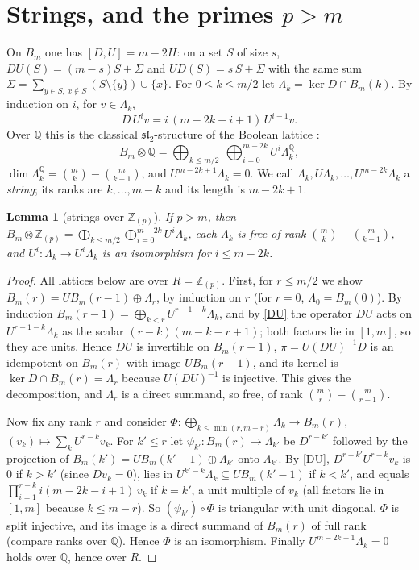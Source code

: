 \documentclass[10pt]{article}
\theoremstyle{ds}
\newtheorem{lemma}{Lemma}
\theoremstyle{dsrem}
\newcommand{\Z}{\mathbb{Z}}
\newcommand{\Q}{\mathbb{Q}}
\begin{document}
\section{Strings, and the primes $p>m$}

On $B_m$ one has $[D,U]=m-2H$: on a set $S$ of size $s$, $DU(S)=(m-s)S+\Sigma$ and $UD(S)=s\,S+\Sigma$ with the same sum $\Sigma=\sum_{y\in S,\,x\notin S}(S\setminus\{y\})\cup\{x\}$. For $0\le k\le m/2$ let $\Lambda_k=\ker D\cap B_m(k)$. By induction on $i$, for $v\in\Lambda_k$,
\begin{equation}\label{DU}
D\,U^iv=i\,(m-2k-i+1)\,U^{i-1}v .
\end{equation}
Over $\Q$ this is the classical $\mathfrak{sl}_2$-structure of the Boolean lattice \cite{Pro}:
\[B_m\otimes\Q=\bigoplus_{k\le m/2}\ \bigoplus_{i=0}^{m-2k}U^i\Lambda_k^{\Q},\]
$\dim\Lambda^{\Q}_k=\binom mk-\binom m{k-1}$, and $U^{m-2k+1}\Lambda_k=0$. We call $\Lambda_k,U\Lambda_k,\dots,U^{m-2k}\Lambda_k$ a \emph{string}; its ranks are $k,\dots,m-k$ and its length is $m-2k+1$.

\begin{lemma}[strings over $\Z_{(p)}$]\label{strings}
If $p>m$, then $B_m\otimes\Z_{(p)}=\bigoplus_{k\le m/2}\bigoplus_{i=0}^{m-2k}U^i\Lambda_k$, each $\Lambda_k$ is free of rank $\binom mk-\binom m{k-1}$, and $U^i\colon\Lambda_k\to U^i\Lambda_k$ is an isomorphism for $i\le m-2k$.
\end{lemma}

\begin{proof}
All lattices below are over $R=\Z_{(p)}$. First, for $r\le m/2$ we show $B_m(r)=U B_m(r-1)\oplus\Lambda_r$, by induction on $r$ (for $r=0$, $\Lambda_0=B_m(0)$). By induction $B_m(r-1)=\bigoplus_{k<r}U^{r-1-k}\Lambda_k$, and by \eqref{DU} the operator $DU$ acts on $U^{r-1-k}\Lambda_k$ as the scalar $(r-k)(m-k-r+1)$; both factors lie in $[1,m]$, so they are units. Hence $DU$ is invertible on $B_m(r-1)$, $\pi=U(DU)^{-1}D$ is an idempotent on $B_m(r)$ with image $UB_m(r-1)$, and its kernel is $\ker D\cap B_m(r)=\Lambda_r$ because $U(DU)^{-1}$ is injective. This gives the decomposition, and $\Lambda_r$ is a direct summand, so free, of rank $\binom mr-\binom m{r-1}$.

Now fix any rank $r$ and consider $\Phi\colon\bigoplus_{k\le\min(r,m-r)}\Lambda_k\to B_m(r)$, $(v_k)\mapsto\sum_kU^{r-k}v_k$. For $k'\le r$ let $\psi_{k'}\colon B_m(r)\to\Lambda_{k'}$ be $D^{r-k'}$ followed by the projection of $B_m(k')=UB_m(k'-1)\oplus\Lambda_{k'}$ onto $\Lambda_{k'}$. By \eqref{DU}, $D^{r-k'}U^{r-k}v_k$ is $0$ if $k>k'$ (since $Dv_k=0$), lies in $U^{k'-k}\Lambda_k\subseteq UB_m(k'-1)$ if $k<k'$, and equals $\prod_{i=1}^{r-k}i(m-2k-i+1)\,v_k$ if $k=k'$, a unit multiple of $v_k$ (all factors lie in $[1,m]$ because $k\le m-r$). So $(\psi_{k'})\circ\Phi$ is triangular with unit diagonal, $\Phi$ is split injective, and its image is a direct summand of $B_m(r)$ of full rank (compare ranks over $\Q$). Hence $\Phi$ is an isomorphism. Finally $U^{m-2k+1}\Lambda_k=0$ holds over $\Q$, hence over $R$.
\end{proof}
\end{document}
